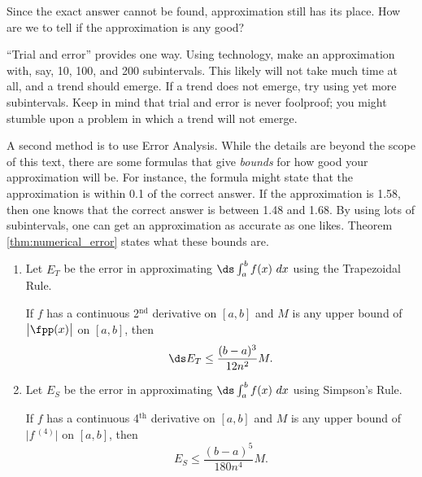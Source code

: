 Since the exact answer cannot be found, approximation still has its place. How are we to tell if the approximation is any good?

``Trial and error'' provides one way. %
Using technology, make an approximation with, say, 10, 100, and 200 subintervals. This likely will not take much time at all, and a trend should emerge. If a trend does not emerge, try using yet more subintervals. Keep in mind that trial and error is never foolproof; you might stumble upon a problem in which a trend will not emerge.
\enlargethispage{2\baselineskip}

A second method is to use Error Analysis. While the details are beyond the scope of this text, there are some formulas that give \textit{bounds} for how good your approximation will be. For instance, the formula might state that the approximation is within 0.1 of the correct answer. If the approximation is 1.58, then one knows that the correct answer is between 1.48 and 1.68. By using lots of subintervals, one can get an approximation as accurate as one likes. Theorem \ref{thm:numerical_error} states what these bounds are.

%
{\begin{enumerate}
\item	Let $E_T$ be the error in approximating $\ds \int_a^b f(x)\ dx$ using the Trapezoidal Rule. 

If $f$ has a continuous 2$^\text{nd}$ derivative on $[a,b]$ and $M$ is any upper bound of $\big|\fpp(x)\big|$ on $[a,b]$, then
$$\ds E_T \leq \frac{(b-a)^3}{12n^2}M.$$

\item	Let $E_S$ be the error in approximating $\ds \int_a^b f(x)\ dx$ using Simpson's Rule. 

If $f$ has a continuous 4$^\text{th}$ derivative on $[a,b]$ and $M$ is any upper bound of $\big|f\,^{(4)}\big|$ on $[a,b]$, then
$$E_S \leq \frac{(b-a)^5}{180n^4}M.$$
\end{enumerate}
}


